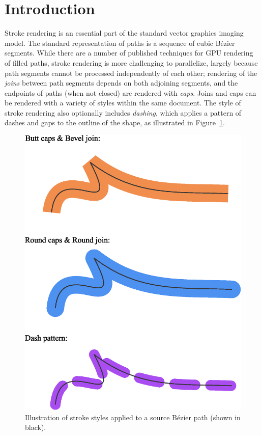 \documentclass[sigconf, nonacm]{acmart}
\begin{document}
\section{Introduction}

Stroke rendering is an essential part of the standard vector graphics imaging model. The standard representation of paths is a sequence of cubic Bézier segments. While there are a number of published techniques for GPU rendering of filled paths, stroke rendering is more challenging to parallelize, largely because path segments cannot be processed independently of each other; rendering of the \emph{joins} between path segments depends on both adjoining segments, and the endpoints of paths (when not closed) are rendered with \emph{caps}. Joins and caps can be rendered with a variety of styles within the same document. The style of stroke rendering also optionally includes \emph{dashing}, which applies a pattern of dashes and gaps to the outline of the shape, as illustrated in Figure~\ref{fig:stroke_styles}.

\begin{figure}
    \vspace{15pt}
    \includegraphics[scale=0.4]{stroke_styles}
    \caption{Illustration of stroke styles applied to a source Bézier path (shown in black).}
    \label{fig:stroke_styles}
\end{figure}
\end{document}
